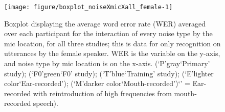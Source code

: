 \begin{figure}[h!]
\DIFaddbeginFL \centering
\textbf{}
\DIFaddendFL 

\texttt{[image: figure/boxplot\_noiseXmicXall\_female-1]} 

\caption{Boxplot displaying the average word error rate (WER) averaged over each participant for the interaction of every noise type by the mic location, for all three studies; this is data for only recognition on utterances by the female speaker. WER is the variable on the y-axis, and noise type by mic location is on the x-axis. (`P'\DIFdelbeginFL \DIFdelFL{,}\DIFdelendFL \DIFaddbeginFL \DIFaddFL{=}\DIFaddendFL gray\DIFdelbeginFL \DIFdelFL{,}\DIFdelendFL \DIFaddbeginFL \DIFaddFL{=}\DIFaddendFL `Primary' study); (`F0'\DIFdelbeginFL \DIFdelFL{,}\DIFdelendFL \DIFaddbeginFL \DIFaddFL{=}\DIFaddendFL green\DIFdelbeginFL \DIFdelFL{,}\DIFdelendFL \DIFaddbeginFL \DIFaddFL{=}\DIFaddendFL `F0' study); (`T'\DIFdelbeginFL \DIFdelFL{,}\DIFdelendFL \DIFaddbeginFL \DIFaddFL{=}\DIFaddendFL blue\DIFdelbeginFL \DIFdelFL{,}\DIFdelendFL \DIFaddbeginFL \DIFaddFL{=}\DIFaddendFL `Training' study); (`E'\DIFdelbeginFL \DIFdelFL{,}\DIFdelendFL \DIFaddbeginFL \DIFaddFL{=}\DIFaddendFL lighter color\DIFdelbeginFL \DIFdelFL{,}\DIFdelendFL \DIFaddbeginFL \DIFaddFL{=}\DIFaddendFL `Ear-recorded'); (`M'\DIFdelbeginFL \DIFdelFL{,}\DIFdelendFL \DIFaddbeginFL \DIFaddFL{=}\DIFaddendFL darker color\DIFdelbeginFL \DIFdelFL{,}\DIFdelendFL \DIFaddbeginFL \DIFaddFL{=}\DIFaddendFL `Mouth-recorded')\DIFdelbeginFL {}\DIFdelendFL \DIFaddbeginFL \DIFaddFL{; (}\DIFaddendFL `\DIFdelbeginFL {}\DIFdelendFL \DIFaddbeginFL {}\DIFaddendFL ' = Ear-recorded \DIFaddbeginFL {}\DIFaddendFL with reintroduction of high frequencies \DIFdelbeginFL \DIFdelFL{(}\DIFdelendFL from mouth-recorded speech).}
\label{fig:female-all}
\end{figure}

